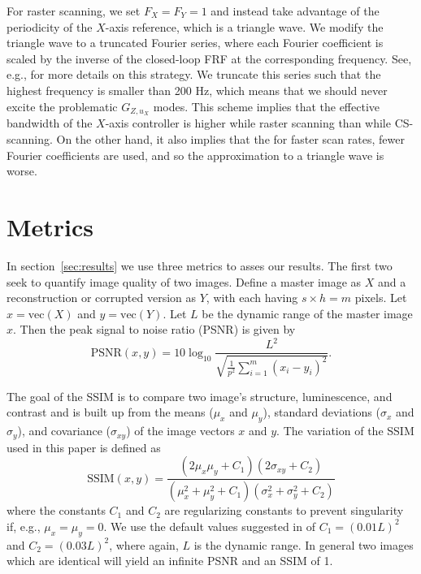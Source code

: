 \documentclass[twocolumn,oneside]{IEEEtran/IEEEtran}
\begin{document}
For raster scanning, we set $F_X=F_Y=1$ and instead take advantage of
the periodicity of the $X$-axis reference, which is a triangle wave.
We modify the triangle wave to a truncated Fourier series, where each
Fourier coefficient is scaled by the inverse of the closed-loop FRF at
the corresponding frequency. See, e.g., \cite{clayton_review_2009} for
more details on this strategy. We truncate this series such that the
highest frequency is smaller than 200 Hz, which means that we should
never excite the problematic $G_{Z,u_X}$ modes. This scheme implies
that the effective bandwidth of the $X$-axis controller is higher
while raster scanning than while CS-scanning. On the other hand, it
also implies that the for faster scan rates, fewer Fourier
coefficients are used, and so the approximation to a triangle wave is
worse.

\section{Metrics}\label{sec:rdi}
In section~\ref{sec:results} we use three metrics to asses our
results. The first two seek to quantify image quality of two images.
Define a master image as $X$ and a reconstruction or corrupted version
as $Y$, with each having $s\times h=m$ pixels. Let $x=\textrm{vec}(X)$
and $y=\textrm{vec}(Y)$. Let $L$ be the dynamic range of the master
image $x$. Then the peak signal to noise ratio (PSNR) is given by
\begin{equation*}
  \text{PSNR}(x,y) = 10\log_{10}\frac{L^2}
  {\sqrt{\frac{1}{p^2} \sum_{i=1}^{m}( x_{i} - y_{i})^2 }}.
\end{equation*}

The goal of the SSIM is to compare two image's structure,
luminescence, and contrast and is built up from the means ($\mu_x$ and
$\mu_y$), standard deviations ($\sigma_x$ and $\sigma_y$), and
covariance ($\sigma_{xy}$) of the image vectors $x$ and $y$. The
variation of the SSIM used in this paper is defined as
\begin{equation*}
  \text{SSIM}(x,y) = \frac{(2\mu_x\mu_y + C_1)(2\sigma_{xy}+C_2)}
  {(\mu_x^2 + \mu_y^2 + C_1)(\sigma_x^2 + \sigma_y^2 + C_2)}
\end{equation*}
where the constants $C_1$ and $C_2$ are regularizing constants to
prevent singularity if, e.g., $\mu_x=\mu_y=0$. We use the default
values suggested in \cite{wang_image_2004} of $C_1=(0.01L)^2$ and
${C_2=(0.03L)^2}$, where again, $L$ is the dynamic range. In general
two images which are identical will yield an infinite PSNR and an SSIM
of 1.
\end{document}
